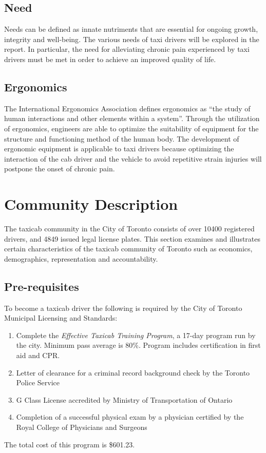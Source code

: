 \documentclass[11pt]{article}
\begin{document}
\subsection{Need}
\label{sec:needs}
Needs can be defined as innate nutriments that are essential for 
ongoing growth, integrity and well-being\cite{deci2000and}. The 
various needs of taxi drivers will be explored in the report. In 
particular, the need for alleviating chronic pain experienced by 
taxi drivers must be met in order to achieve an improved quality 
of life. 

\subsection{Ergonomics}
\label{sec:ergonomics}

The International Ergonomics Association defines ergonomics as “the
study of human interactions and other elements within a system”\cite{ergo}. 
Through the utilization of ergonomics, engineers are able to optimize the suitability
of equipment for the structure and functioning method of the human
body. The development of ergonomic equipment is applicable to
taxi drivers because optimizing the interaction of the cab driver
and the vehicle to avoid repetitive strain injuries will postpone
the onset of chronic pain. 

\section{Community Description}
\label{sec:community}
The taxicab community in the City of Toronto consists of over 10400 registered drivers, 
and 4849 issued legal license plates. This section examines and 
illustrates certain characteristics of the taxicab community of Toronto such as economics, 
demographics, representation and accountability.

\subsection{Pre-requisites}
To become a taxicab driver the following is required by the City of Toronto Municipal Licensing and Standards:
\begin{enumerate}
\item Complete the \emph{Effective Taxicab Training Program}, a 17-day program run by the city. 
Minimum pass average is 80\%. Program includes certification in first aid and CPR.
\item Letter of clearance for a criminal record background check by the Toronto Police Service
\item G Class License accredited by Ministry of Transportation of Ontario 
\item Completion of a successful physical exam by a physician certified by the Royal College of Physicians and Surgeons 
\end{enumerate}
The total cost of this program is \$601.23\cite{MLS2013}.
\end{document}
